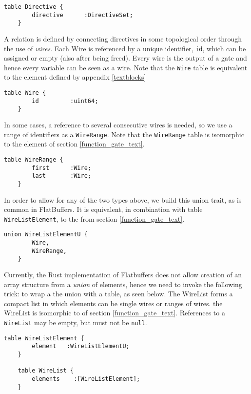\begin{lstlisting}[style=fbslisting]
    table Directive {
        directive      :DirectiveSet;
    }
\end{lstlisting}

A relation is defined by connecting directives in some topological order through the use of \emph{wires}. Each \textsf{Wire} is referenced by a unique identifier, \texttt{id}, which can be assigned or empty (also after being freed). Every wire is the output of a gate and hence every variable can be seen as a wire. Note that the \texttt{Wire} table is equivalent to the  element defined by appendix \ref{textblocks}

\begin{lstlisting}[style=fbslisting]
    table Wire {
        id         :uint64;
    }
\end{lstlisting}

In some cases, a reference to several consecutive wires is needed, so we use a range of identifiers as a \texttt{WireRange}. Note that the \texttt{WireRange} table is isomorphic to the  element of section \ref{function_gate_text}.

\begin{lstlisting}[style=fbslisting]
    table WireRange {
        first      :Wire;
        last       :Wire;
    }
\end{lstlisting}

In order to allow for any of the two types above, we build this union trait, as is common in FlatBuffers. It is equivalent, in combination with table \texttt{WireListElement}, to the  from section \ref{function_gate_text}.

\begin{lstlisting}[style=fbslisting]
    union WireListElementU {
        Wire,
        WireRange,
    }
\end{lstlisting}

Currently, the Rust implementation of Flatbuffers does not allow creation of
an array structure from a \emph{union} of elements, hence we need to invoke the
following trick: to wrap a the union with a table, as seen below. The \textsf{WireList} forms a compact list in which elements can be single wires or ranges of wires. the \textsf{WireList} is isomorphic to  of section \ref{function_gate_text}.
References to a \texttt{WireList} may be empty, but must not be \texttt{null}.

\begin{lstlisting}[style=fbslisting]
    table WireListElement {
        element   :WireListElementU;
    }

    table WireList {
        elements    :[WireListElement];
    }
\end{lstlisting}

